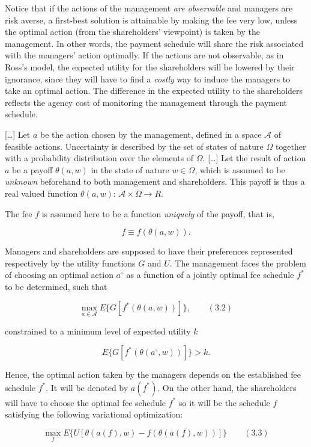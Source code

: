 \documentclass[11pt,a4paper]{article}
\begin{document}
Notice that if the actions of the management \emph{are observable} and managers are risk averse, a
first-best solution is attainable by making the fee very low, unless the optimal action (from the
shareholders' viewpoint) is taken by the management. In other words, the payment schedule will share
the risk associated with the managers' action optimally. If the actions are not observable, as in
Ross's model, the expected utility for the shareholders will be lowered by their ignorance, since
they will have to find a \emph{costly} way to induce the managers to take an optimal action. The
difference in the expected utility to the shareholders reflects the agency cost of monitoring the
management through the payment schedule.

{[}\ldots{]} Let \(a\) be the action chosen by the management, defined in a space \(\mathcal{A}\) of
feasible actions. Uncertainty is described by the set of states of nature \(\Omega\) together with a
probability distribution over the elements of \(\Omega\). {[}\ldots{]} Let the result of action
\(a\) be a payoff \(\theta(a, w)\) in the state of nature \(w \in \Omega\), which is assumed to be
\emph{unknown} beforehand to both management and shareholders. This payoff is thus a real valued
function \(\theta(a, w)\): \(\mathcal{A} \times \Omega \to R\).

The fee \(f\) is assumed here to be a function \emph{uniquely} of the payoff, that is,

\[f \equiv f(\theta(a, w)).\]

Managers and shareholders are supposed to have their preferences represented respectively by the
utility functions \(G\) and \(U\). The management faces the problem of choosing an optimal action
\(a^\circ\) as a function of a jointly optimal fee schedule \(f^*\) to be determined, such that

\[\max_{a \in \mathcal{A}} E\{G[f^*(\theta(a, w))]\}, \qquad (3.2)\]

constrained to a minimum level of expected utility \(k\)

\[E\{G[f^*(\theta(a^\circ, w))]\} > k.\]

Hence, the optimal action taken by the managers depends on the established fee schedule \(f^*\). It
will be denoted by \(a(f^*)\). On the other hand, the shareholders will have to choose the optimal
fee schedule \(f^*\) so it will be the schedule \(f\) satisfying the following variational
optimization:

\[\max_f E\{U[\theta(a(f), w) - f(\theta(a(f), w))]\} \qquad (3.3)\]
\end{document}
